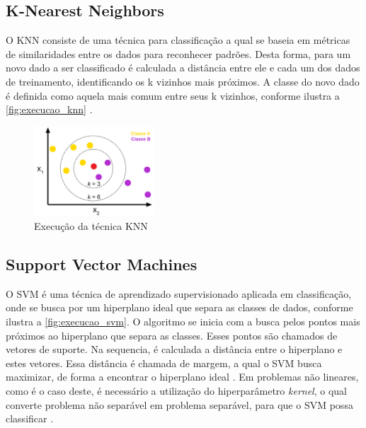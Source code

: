 \subsection{K-Nearest Neighbors}

O KNN consiste de uma técnica para classificação a qual se baseia em métricas de similaridades entre os dados para reconhecer padrões. Desta forma, para um novo dado a ser classificado é calculada a distância entre ele e cada um dos dados de treinamento, identificando os k vizinhos mais próximos. A classe do novo dado é definida como aquela mais comum entre seus k vizinhos, conforme ilustra a \autoref{fig:execucao_knn} \cite{Khandelwal2018}.

\begin{figure}[h]
  \centering
  \caption{Execução da técnica KNN}
   \label{fig:execucao_knn}
   \includegraphics[width=0.4\textwidth]{figuras/fig_6.png}
\end{figure}

\subsection{Support Vector Machines}

O SVM é uma técnica de aprendizado supervisionado aplicada em classificação, onde se busca por um hiperplano ideal que separa as classes de dados, conforme ilustra a \autoref{fig:execucao_svm}. O algoritmo se inicia com a busca pelos pontos mais próximos ao hiperplano que separa as classes. Esses pontos são chamados de vetores de suporte. Na sequencia, é calculada a distância entre o hiperplano e estes vetores. Essa distância é chamada de margem, a qual o SVM busca maximizar, de forma a encontrar o hiperplano ideal \cite{Pupale2019}. Em problemas não lineares, como é o caso deste, é necessário a utilização do hiperparâmetro \textit{kernel}, o qual converte problema não separável em problema separável, para que o SVM possa classificar \cite{Shubham2018}.


